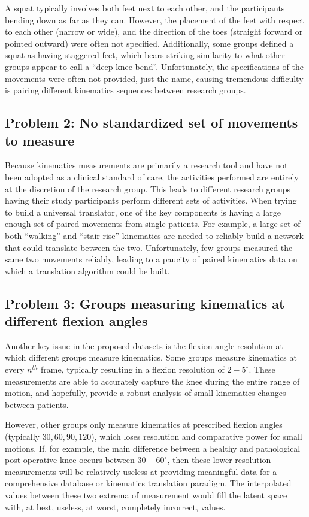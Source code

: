 A squat typically involves both feet next to each other, and the participants bending down as far as they can.
However, the placement of the feet with respect to each other (narrow or wide), and the direction of the toes (straight forward or pointed outward) were often not specified.
Additionally, some groups defined a squat as having staggered feet, which bears striking similarity to what other groups appear to call a ``deep knee bend''.
Unfortunately, the specifications of the movements were often not provided, just the name, causing tremendous difficulty is pairing different kinematics sequences between research groups.
\subsection{Problem 2: No standardized set of movements to measure}
Because kinematics measurements are primarily a research tool and have not been adopted as a clinical standard of care, the activities performed are entirely at the discretion of the research group.
This leads to different research groups having their study participants perform different sets of activities.
When trying to build a universal translator, one of the key components is having a large enough set of paired movements from single patients.
For example, a large set of both ``walking'' and ``stair rise'' kinematics are needed to reliably build a network that could translate between the two.
Unfortunately, few groups measured the same two movements reliably, leading to a paucity of paired kinematics data on which a translation algorithm could be built.

\subsection{Problem 3: Groups measuring kinematics at different flexion angles}
Another key issue in the proposed datasets is the flexion-angle resolution at which different groups measure kinematics.
Some groups measure kinematics at every $n^{th}$ frame, typically resulting in a flexion resolution of $2-5^{\circ}$.
These measurements are able to accurately capture the knee during the entire range of motion, and hopefully, provide a robust analysis of small kinematics changes between patients.

However, other groups only measure kinematics at prescribed flexion angles (typically $30,60,90,120$), which loses resolution and comparative power for small motions.
If, for example, the main difference between a healthy and pathological post-operative knee occurs between $30-60^{\circ}$, then these lower resolution measurements will be relatively useless at providing meaningful data for a comprehensive database or kinematics translation paradigm.
The interpolated values between these two extrema of measurement would fill the latent space with, at best, useless, at worst, completely
incorrect, values.

